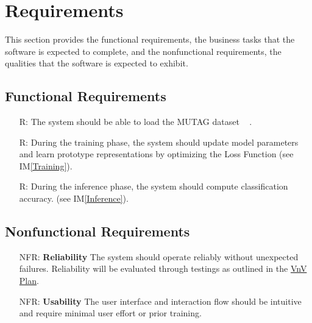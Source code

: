 \documentclass[12pt]{article}
\newcommand{\iref}[1]{IM\ref{#1}}
\newcounter{reqnum} %
\newcounter{nfrnum} %
\begin{document}
\section{Requirements}

This section provides the functional requirements, the business tasks that the
software is expected to complete, and the nonfunctional requirements, the
qualities that the software is expected to exhibit.

\subsection{Functional Requirements}

\noindent \begin{itemize}

\item[R\refstepcounter{reqnum}\thereqnum \label{R_Inputs}:] The system should be able to load the MUTAG dataset ~\citep{debnath1991structure} .

\item[R\refstepcounter{reqnum}\thereqnum \label{R_Train}:] During the training phase, the system should update model parameters and learn prototype representations by optimizing the Loss Function (see \iref{Training}).

\item[R\refstepcounter{reqnum}\thereqnum \label{R_VerifyOutput}:] During the inference phase, the system should compute classification accuracy. (see \iref{Inference}).


\end{itemize}

\subsection{Nonfunctional Requirements}

\noindent \begin{itemize}

\item[NFR\refstepcounter{nfrnum}\thenfrnum \label{NFR_Reliability}:] 
    \textbf{Reliability}
    The system should operate reliably without unexpected failures. Reliability will be evaluated through testings as outlined in the 
    \href{https://github.com/Yuanqi-X/Re-ProtGNN/blob/main/docs/VnVPlan/VnVPlan.pdf}{VnV Plan}.

\item[NFR\refstepcounter{nfrnum}\thenfrnum \label{NFR_Usability}:] 
    \textbf{Usability}
    The user interface and interaction flow should be intuitive and require minimal user effort or prior training.


\end{itemize}
\end{document}
